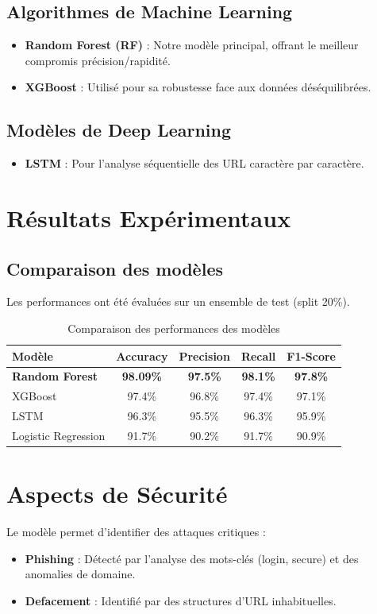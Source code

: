 \documentclass[12pt,a4paper]{article}
\begin{document}
\subsection{Algorithmes de Machine Learning}
\begin{itemize}
    \item \textbf{Random Forest (RF)} : Notre modèle principal, offrant le meilleur compromis précision/rapidité.
    \item \textbf{XGBoost} : Utilisé pour sa robustesse face aux données déséquilibrées.
\end{itemize}

\subsection{Modèles de Deep Learning}
\begin{itemize}
    \item \textbf{LSTM} : Pour l'analyse séquentielle des URL caractère par caractère.
\end{itemize}

\section{Résultats Expérimentaux}
\subsection{Comparaison des modèles}
Les performances ont été évaluées sur un ensemble de test (split 20\%).

\begin{table}[H]
\centering
\caption{Comparaison des performances des modèles}
\begin{tabular}{@{}lcccc@{}}
\toprule
\textbf{Modèle} & \textbf{Accuracy} & \textbf{Precision} & \textbf{Recall} & \textbf{F1-Score} \\ \midrule
\textbf{Random Forest} & \textbf{98.09\%} & \textbf{97.5\%} & \textbf{98.1\%} & \textbf{97.8\%} \\
XGBoost & 97.4\% & 96.8\% & 97.4\% & 97.1\% \\
LSTM & 96.3\% & 95.5\% & 96.3\% & 95.9\% \\
Logistic Regression & 91.7\% & 90.2\% & 91.7\% & 90.9\% \\ \bottomrule
\end{tabular}
\end{table}

\section{Aspects de Sécurité}
Le modèle permet d'identifier des attaques critiques :
\begin{itemize}
    \item \textbf{Phishing} : Détecté par l'analyse des mots-clés (login, secure) et des anomalies de domaine.
    \item \textbf{Defacement} : Identifié par des structures d'URL inhabituelles.
\end{itemize}
\end{document}

